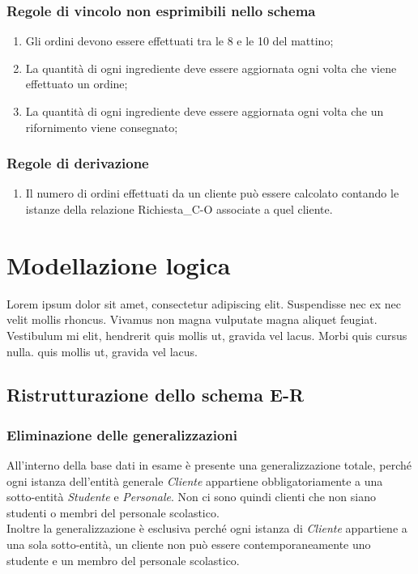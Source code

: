 \documentclass[12pt,a4paper]{article}
\begin{document}
    \subsubsection{Regole di vincolo non esprimibili nello schema}
    \begin{enumerate}[leftmargin=3em,label=\textbf{(RV\arabic*)}]
        \item  Gli ordini devono essere effettuati tra le 8 e le 10 del mattino;
        \item La quantità di ogni ingrediente deve essere aggiornata ogni volta che viene effettuato un ordine;
        \item La quantità di ogni ingrediente deve essere aggiornata ogni volta che un rifornimento viene consegnato;
    \end{enumerate}

    \subsubsection{Regole di derivazione}
    \begin{enumerate}[leftmargin=3em,label=\textbf{(RD\arabic*)}]
        \item  Il numero di ordini effettuati da un cliente può essere calcolato contando le istanze della relazione Richiesta\_C-O associate a quel cliente.
    \end{enumerate}

    \newpage
    \section{Modellazione logica}
    Lorem ipsum dolor sit amet, consectetur adipiscing elit. Suspendisse nec ex nec velit mollis rhoncus. Vivamus non magna vulputate magna aliquet feugiat. Vestibulum mi elit, hendrerit quis mollis ut, gravida vel lacus. Morbi quis cursus nulla. 
    quis mollis ut, gravida vel lacus.
    \subsection{Ristrutturazione dello schema E-R}
    \subsubsection{Eliminazione delle generalizzazioni}
    All'interno della base dati in esame è presente una generalizzazione totale, perché ogni istanza dell'entità generale \textit{Cliente} appartiene obbligatoriamente a una sotto-entità \textit{Studente} e \textit{Personale}. Non ci sono quindi clienti che non siano studenti o membri del personale scolastico.\\
    Inoltre la generalizzazione è esclusiva perché ogni istanza di \textit{Cliente} appartiene a una sola sotto-entità, un cliente non può essere contemporaneamente uno studente e un membro del personale scolastico.
\end{document}
